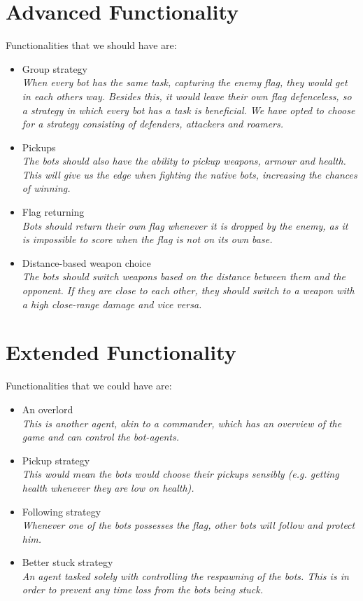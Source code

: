 \section{Advanced Functionality}
Functionalities that we should have are:
\begin{itemize}
	\item Group strategy \\
		\textit{When every bot has the same task, capturing the enemy flag, they would get in each others way. Besides this, it would leave their own flag defenceless, so a strategy in which every bot has a task is beneficial. We have opted to choose for a strategy consisting of defenders, attackers and roamers.}
	\item Pickups \\
		\textit{The bots should also have the ability to pickup weapons, armour and health. This will give us the edge when fighting the native bots, increasing the chances of winning.}
	\item Flag returning \\
		\textit{Bots should return their own flag whenever it is dropped by the enemy, as it is impossible to score when the flag is not on its own base.}
	\item Distance-based weapon choice \\
		\textit{The bots should switch weapons based on the distance between them and the opponent. If they are close to each other, they should switch to a weapon with a high close-range damage and vice versa.}
\end{itemize}

\section{Extended Functionality}
Functionalities that we could have are:
\begin{itemize}
	\item An overlord \\
		\textit{This is another agent, akin to a commander, which has an overview of the game and can control the bot-agents.}
	\item Pickup strategy \\
		\textit{This would mean the bots would choose their pickups sensibly (e.g. getting health whenever they are low on health).}
	\item Following strategy \\
		\textit{Whenever one of the bots possesses the flag, other bots will follow and protect him.}
	\item Better stuck strategy \\
		\textit{An agent tasked solely with controlling the respawning of the bots. This is in order to prevent any time loss from the bots being stuck.}
\end{itemize}

